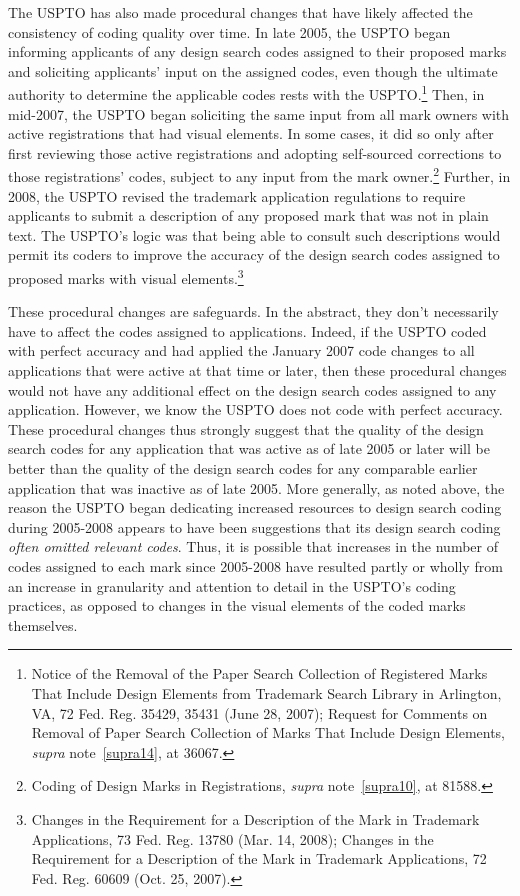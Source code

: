 \documentclass[letterpaper, 11pt, oneside]{article}
\begin{document}
\begin{enumerate}
The USPTO has also made procedural changes that have likely affected the consistency of coding quality over time. In late 2005, the USPTO began informing applicants of any design search codes assigned to their proposed marks and soliciting applicants' input on the assigned codes, even though the ultimate authority to determine the applicable codes rests with the USPTO.\footnote{\label{supra27} Notice of the Removal of the Paper Search Collection of Registered Marks That Include Design Elements from Trademark Search Library in Arlington, VA, 72 Fed. Reg. 35429, 35431 (June 28, 2007); Request for Comments on Removal of Paper Search Collection of Marks That Include Design Elements, \textit{supra} note~\ref{supra14}, at 36067.} Then, in mid-2007, the USPTO began soliciting the same input from all mark owners with active registrations that had visual elements. In some cases, it did so only after first reviewing those active registrations and adopting self-sourced corrections to those registrations' codes, subject to any input from the mark owner.\footnote{Coding of Design Marks in Registrations, \textit{supra} note~\ref{supra10}, at 81588.} Further, in 2008, the USPTO revised the trademark application regulations to require applicants to submit a description of any proposed mark that was not in plain text. The USPTO's logic was that being able to consult such descriptions would permit its coders to improve the accuracy of the design search codes assigned to proposed marks with visual elements.\footnote{Changes in the Requirement for a Description of the Mark in Trademark Applications, 73 Fed. Reg. 13780 (Mar. 14, 2008); Changes in the Requirement for a Description of the Mark in Trademark Applications, 72 Fed. Reg. 60609 (Oct. 25, 2007).}

These procedural changes are safeguards. In the abstract, they don't necessarily have to affect the codes assigned to applications. Indeed, if the USPTO coded with perfect accuracy and had applied the January 2007 code changes to all applications that were active at that time or later, then these procedural changes would not have any additional effect on the design search codes assigned to any application. However, we know the USPTO does not code with perfect accuracy. These procedural changes thus strongly suggest that the quality of the design search codes for any application that was active as of late 2005 or later will be better than the quality of the design search codes for any comparable earlier application that was inactive as of late 2005. More generally, as noted above, the reason the USPTO began dedicating increased resources to design search coding during 2005-2008 appears to have been suggestions that its design search coding \textit{often omitted relevant codes}. Thus, it is possible that increases in the number of codes assigned to each mark since 2005-2008 have resulted partly or wholly from an increase in granularity and attention to detail in the USPTO's coding practices, as opposed to changes in the visual elements of the coded marks themselves.

\end{enumerate}
\end{document}
